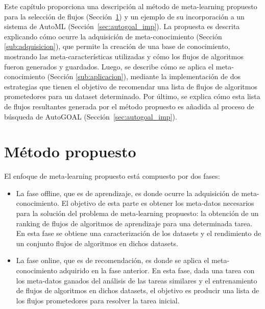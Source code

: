 Este capítulo proporciona una descripción al método de meta-learning propuesto para la selección de flujos (Sección~\ref{sec:proposal}) y un ejemplo de su incorporación a un sistema de AutoML (Sección~\ref{sec:autogoal_imp}). La propuesta es descrita explicando cómo ocurre la adquisición de meta-conocimiento (Sección \ref{sub:adquisicion}), que permite la creación de una base de conocimiento, mostrando las meta-características utilizadas y cómo los flujos de algoritmos fueron generados y guardados. Luego, se describe cómo se aplica el meta-conocimiento (Sección \ref{sub:aplicacion}), mediante la implementación de dos estrategias que tienen el objetivo de recomendar una lista de flujos de algoritmos prometedores para un dataset determinado. Por último, se explica cómo esta lista de flujos resultantes generada por el método propuesto es añadida al proceso de búsqueda de AutoGOAL (Sección~\ref{sec:autogoal_imp}).

\section{Método propuesto}\label{sec:proposal}

%

El enfoque de meta-learning propuesto está compuesto por dos fases:
\begin{itemize}
	\item La fase offline, que es de aprendizaje, es donde ocurre la adquisición de meta-conocimiento. El objetivo de esta parte es obtener los meta-datos necesarios para la solución del problema de meta-learning propuesto: la obtención de un ranking de flujos de algoritmos de aprendizaje para una determinada tarea. En esta fase se obtiene una caracterización de los datasets y el rendimiento de un conjunto flujos de algoritmos en dichos datasets.
	\item La fase online, que es de recomendación, es donde se aplica el meta-conocimiento adquirido en la fase anterior. En esta fase, dada una tarea con los meta-datos ganados del análisis de las tareas similares y el entrenamiento de flujos de algoritmos en dichos datasets, el objetivo es producir una lista de los flujos prometedores para resolver la tarea inicial.
\end{itemize}

